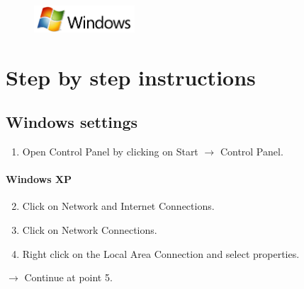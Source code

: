 \documentclass[a4paper,12pt]{scrartcl}
\begin{document}
\newpage
\enlargethispage{20pt}

\begin{figure}[t!]
    \raggedleft
    \vspace{-20pt}
    \includegraphics[height=1cm,keepaspectratio]{Bilder/Windows_logo}
    \vspace{-20pt}
\end{figure}

\section*{Step by step instructions}
\subsection*{Windows settings}
\begin{enumerate}
    \item Open Control Panel by clicking on Start $\rightarrow$ Control Panel.
\end{enumerate}
\vspace{-15pt}
\paragraph*{Windows XP}
\begin{enumerate}
     \setcounter{enumi}{1}
     \item Click on Network and Internet Connections.
     \item Click on Network Connections.
     \item Right click on the Local Area Connection and select properties.
\end{enumerate}
$\rightarrow$ Continue at point 5.
\vspace{-10pt}
\end{document}
